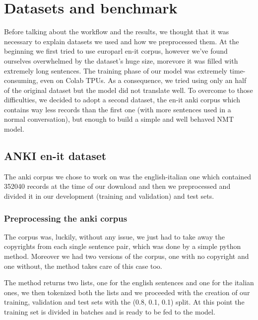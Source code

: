 \section{Datasets and benchmark}\label{sec:dataset}
Before talking about the workflow and the results, we thought that it was necessary to explain datasets we used and how we preprocessed them. At the beginning we first tried to use  europarl en-it corpus, however we've found ourselves overwhelmed by the dataset's huge size, morevore it was filled with extremely long sentences. The training phase of our model was extremely time-consuming, even on Colab TPUs. As a consequence, we tried using only an half of the original dataset but the model did not translate well. To overcome to those difficulties,  we decided to adopt a second dataset, the en-it anki corpus which contains way less records than the first one (with more sentences used in a normal conversation), but enough to build a simple and well behaved NMT model.
\subsection{ANKI en-it dataset}
The anki corpus\cite{anki_dataset} we chose to work on was the english-italian one which contained 352040 records at the time of our download and then we preprocessed and divided it in our development (training and validation) and test sets.
\subsubsection{Preprocessing the anki corpus}
The corpus was, luckily, without any issue, we just had to take away the copyrights from each single sentence pair, which was done by a simple python method. Moreover we had two versions of the corpus, one with no copyright and one without, the method takes care of this case too.
\begin{comment}
\begin{verbatim}
def create_dataset_anki(name: str, preprocessed: bool = False):
    with open(name, encoding="UTF-8") as datafile:
        src_set = list()
        dst_set = list()
        for sentence in datafile:
            sentence = sentence.split("\t")
            src_set.append(sentence[0])
            if preprocessed:
                dst_set.append(sentence[1].split("\n")[0])
            else:
                dst_set.append(sentence[1])

    return src_set, dst_set
\end{verbatim}
\end{comment}
The method returns two lists, one for the english sentences and one for the italian ones, we then tokenized both the lists and we proceeded with the creation of our training, validation and test sets with the (0.8, 0.1, 0.1) split.
At this point the training set is divided in batches and is ready to be fed to the model.
